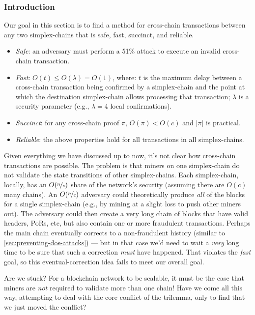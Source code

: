 
\subsubsection{Introduction}

Our goal in this section is to find a method for cross-chain transactions between any two simplex-chains that is safe, fast, succinct, and reliable.
\begin{itemize}
    \item \emph{Safe}: an adversary must perform a 51\% attack to execute an invalid cross-chain transaction.
    \item \emph{Fast}: $O(t) \le O(\lambda) = O(1)$, where: $t$ is the maximum delay between a cross-chain transaction being confirmed by a simplex-chain and the point at which the destination simplex-chain allows processing that transaction; $\lambda$ is a security parameter (e.g., $\lambda = 4$ local confirmations).
    \item \emph{Succinct}: for any cross-chain proof $\pi$, $O(\pi) < O(c)$ and $|\pi|$ is practical.
    \item \emph{Reliable}: the above properties hold for all transactions in all simplex-chains.
\end{itemize}

Given everything we have discussed up to now, it's not clear how cross-chain transactions are possible.
The problem is that miners on one simplex-chain do not validate the state transitions of other simplex-chains.
Each simplex-chain, locally, has an $O(\nicefrac{n}{c})$ share of the network's security (assuming there are $O(c)$ many chains).
An $O(\nicefrac{n}{c})$ adversary could theoretically produce \emph{all} of the blocks for a single simplex-chain (e.g., by mining at a slight loss to push other miners out).
The adversary could then create a very long chain of blocks that have valid headers, PoRs, etc, but also contain one or more fraudulent transactions.
Perhaps the main chain eventually corrects to a non-fraudulent history (similar to \autoref{sec:preventing-dos-attacks}) --- but in that case we'd need to wait a \emph{very} long time to be sure that such a correction \emph{must} have happened.
That violates the \emph{fast} goal, so this eventual-correction idea fails to meet our overall goal.

Are we stuck?
For a blockchain network to be scalable, it must be the case that miners are \emph{not} required to validate more than one chain!
Have we come all this way, attempting to deal with the core conflict of the trilemma, only to find that we just moved the conflict?


